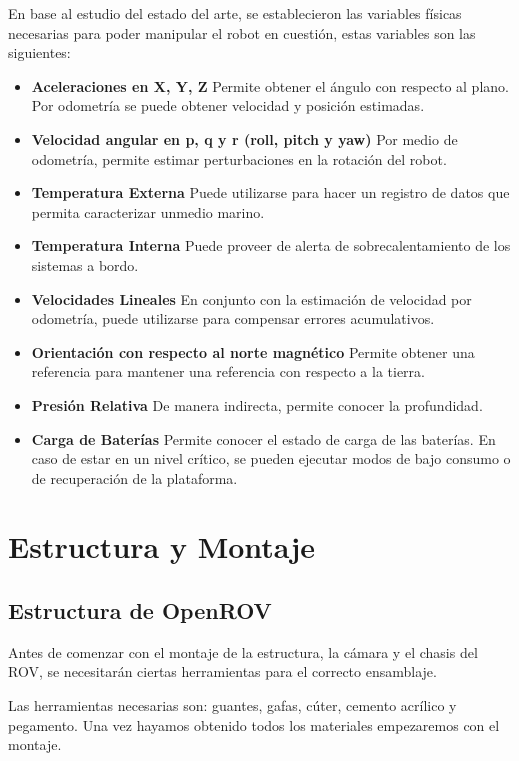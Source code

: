 En base al estudio del estado del arte, se establecieron las variables físicas necesarias para poder manipular el robot en cuestión, estas variables son las siguientes:
  \begin{itemize}
  \item \textbf{Aceleraciones en X, Y, Z} Permite obtener el ángulo con respecto al plano. Por odometría se puede obtener velocidad y posición estimadas.
  \item \textbf{Velocidad angular en p, q y r (roll, pitch y yaw)} Por medio de odometría, permite estimar perturbaciones en la rotación del robot.
  \item \textbf{Temperatura Externa} Puede utilizarse para hacer un registro de datos que permita caracterizar unmedio marino.
  \item \textbf{Temperatura Interna} Puede proveer de alerta de sobrecalentamiento de los sistemas a bordo.
  \item \textbf{Velocidades Lineales} En conjunto con la estimación de velocidad por odometría, puede utilizarse para compensar errores acumulativos.
  \item \textbf{Orientación con respecto al norte magnético} Permite obtener una referencia para mantener una referencia con respecto a la tierra.
  \item \textbf{Presión Relativa} De manera indirecta, permite conocer la profundidad.
  \item \textbf{Carga de Baterías} Permite conocer el estado de carga de las baterías. En caso de estar en un nivel crítico, se pueden ejecutar modos de bajo consumo o de recuperación de la plataforma.
  \end{itemize}

\section{Estructura y Montaje}
\label{cap:montaje}

\subsection{Estructura de OpenROV}
\label{subsec:EstructuraOpenROV}

Antes de comenzar con el montaje de la estructura, la cámara y el chasis del ROV, se necesitarán ciertas herramientas para el correcto ensamblaje.

Las herramientas necesarias son: guantes, gafas, cúter, cemento acrílico y pegamento. Una vez hayamos obtenido todos los materiales empezaremos con el montaje.

